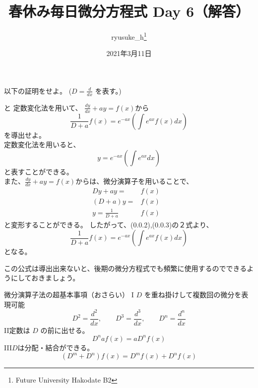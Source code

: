 \documentclass[a4j]{jsarticle}
\title{春休み毎日微分方程式 Day 6（解答）}
\author{ryusuke\_h\thanks{Future University Hakodate B2}}
\date{2021年3月11日}
\begin{document}
\begin{spacing}{1.6}
\maketitle

以下の証明をせよ。 ($ \displaystyle D = \frac{d}{dx} $ を表す。)
\begin{qparts}
     と {\bm 定数変化法}を用いて、
    $ \displaystyle \frac{dy}{dx} + ay = f(x) から $
    \begin{equation}
      \frac{1}{D + a}f(x) = e ^ {-ax} \left(\int e ^ {ax} f(x) dx \right )
    \end{equation}を導出せよ。 \\
    定数変化法を用いると、
    \begin{equation}
      y = e ^ {-ax} \left( \int e^{ax}dx \right)
    \end{equation}
    と表すことができる。\\
    また、$ \displaystyle \frac{dy}{dx} + ay = f(x) から $は、微分演算子を用いることで、\\
    \begin{eqnarray}
      Dy + ay =  & f(x) & \nonumber \\
      (D + a)y = & f(x) & \nonumber \\
      y = \frac{1}{D + a} & f(x) &
      \end{eqnarray}
      と変形することができる。
    したがって、(0.0.2),(0.0.3)の２式より、\\
    \begin{equation*}
      \frac{1}{D + a}f(x) = e ^ {-ax} \left(\int e ^ {ax} f(x) dx \right )
    \end{equation*}
    となる。\\
  \end{qparts}
  この公式は導出出来ないと、後期の微分方程式でも頻繁に使用するのでできるようにしておきましょう。\\
  \begin{itembox}{微分演算子法の超基本事項（おさらい）}
    {\rm I} \quad $ D $ を重ね掛けして複数回の微分を表現可能 \\
    \begin{equation*}
      D^2 = \frac{d^2}{dx},\qquad D^3 = \frac{d ^ 3}{dx}, \qquad D ^ n = \frac{d^n}{dx}
    \end{equation*}
    {\rm II}\quad 定数は $ D $ の前に出せる。\\
    \begin{equation*}
      D^naf(x) = aD^nf(x)
    \end{equation*}
    {\rm III}\quad $ D $は分配・結合ができる。\\
    \begin{equation*}
      (D ^ m + D ^ n)f(x) = D^mf(x) + D^nf(x)
    \end{equation*}
  \end{itembox}
\end{spacing}
\end{document}
